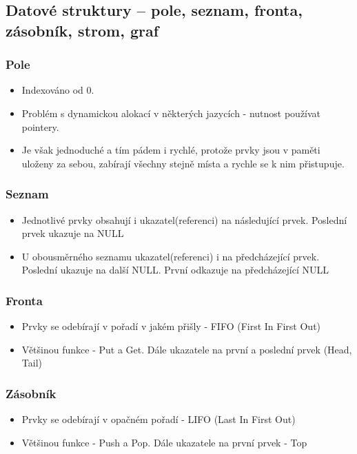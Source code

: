 \documentclass[10pt,a4paper]{article}
\begin{document}
\subsection{Datové struktury – pole, seznam, fronta, zásobník, strom, graf}
\subsubsection{Pole}
\begin{itemize}
\item Indexováno od 0.
\item Problém s dynamickou alokací v některých jazycích - nutnost používat pointery.
\item Je však jednoduché a tím pádem i rychlé, protože prvky jsou v paměti uloženy za sebou, zabírají všechny stejně místa a rychle se k nim přistupuje.
\end{itemize}
\subsubsection{Seznam}
\begin{itemize}
\item Jednotlivé prvky obsahují i ukazatel(referenci) na následující prvek. Poslední prvek ukazuje na NULL
\item U obousměrného seznamu ukazatel(referenci) i na předcházející prvek. Poslední ukazuje na další NULL. První odkazuje na předcházející NULL
\end{itemize}
\subsubsection{Fronta}
\begin{itemize}
\item Prvky se odebírají v pořadí v jakém přišly - FIFO (First In First Out)
\item Většinou funkce - Put a Get. Dále ukazatele na první a poslední prvek (Head, Tail)
\end{itemize}
\subsubsection{Zásobník}
\begin{itemize}
\item Prvky se odebírají v opačném pořadí - LIFO (Last In First Out)
\item Většinou funkce - Push a Pop. Dále ukazatele na první prvek - Top
\end{itemize}
\end{document}
